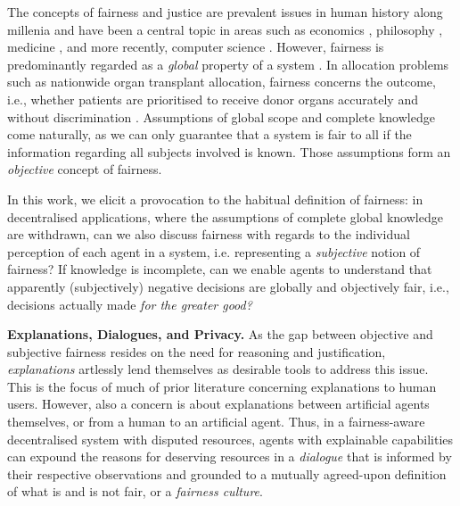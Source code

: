 \documentclass[acmsmall]{custom-arxiv}  %
\begin{document}
The concepts of fairness and justice are prevalent issues in human history along millenia and have been a central topic in areas such as economics \citep{Marx1875CritiqueGotha}, philosophy \citep{Rawls1991JusticeMetaphysical}, medicine \citep{Moskop2007TriagePrinciples}, and more recently, computer science \citep{li_interdisciplinary_2017}. However, fairness is predominantly regarded as a \textit{global} property of a system \citep{selbst_fairness_2019, verma_fairness_2018, narayanan_translation_2018}. In allocation problems such as nationwide organ transplant allocation, fairness concerns the outcome, i.e., whether patients are prioritised to receive donor organs accurately and without discrimination \citep{bertsimas_fairness_2013}. Assumptions of global scope and complete knowledge come naturally, as we can only guarantee that a system is fair to all if the information regarding all subjects involved is known. Those assumptions form an \textit{objective} concept of fairness.

In this work, we elicit a provocation to the habitual definition of fairness: in decentralised applications, where the assumptions of complete global knowledge are withdrawn, can we also discuss fairness with regards to the individual perception of each agent in a system, i.e. representing a \textit{subjective} notion of fairness? If knowledge is incomplete, can we enable agents to understand that apparently (subjectively) negative decisions are globally and objectively fair, i.e., decisions actually made \textit{for the greater good?}












\textbf{Explanations, Dialogues, and Privacy.} As the gap between objective and subjective fairness resides on the need for reasoning and justification, \textit{explanations} \citep{Cyras2019ExplanationsDispute, Rosenfeld2019ExplainabilitySystems, Sovrano2021FromExplanation} artlessly lend themselves as desirable tools to address this issue. This is the focus of much of prior literature concerning explanations to human users. However, also a concern is about explanations between artificial agents themselves, or from a human to an artificial agent. Thus, in a fairness-aware decentralised system with disputed resources, agents with explainable capabilities can expound the reasons for deserving resources in a \textit{dialogue} that is informed by their respective observations and grounded to a mutually agreed-upon definition of what is and is not fair, or a \textit{fairness culture}.%
\end{document}
